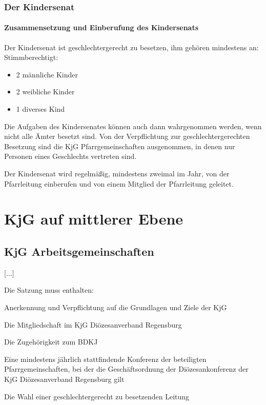 \documentclass[12pt]{report}
\begin{document}
\begin{flushleft}
\subsection{Der Kindersenat}

\subsubsection{Zusammensetzung und Einberufung des Kindersenats}

Der Kindersenat ist {\color{red}geschlechtergerecht} zu besetzen, ihm gehören mindestens an:
Stimmberechtigt:
{\color{red}
\begin{itemize}
  \item 2 männliche Kinder
  \item 2 weibliche Kinder
  \item 1 diverses Kind
\end{itemize}
} %
Die Aufgaben des Kindersenates können auch dann wahrgenommen werden, wenn nicht alle Ämter besetzt sind.
{\color{red}Von der Verpflichtung zur geschlechtergerechten Besetzung sind die KjG Pfarrgemeinschaften ausgenommen,
in denen nur Personen eines Geschlechts vertreten sind.}

Der Kindersenat wird regelmäßig, mindestens zweimal im Jahr, von der Pfarrleitung einberufen
und von einem Mitglied der Pfarrleitung geleitet.

\chapter{KjG auf mittlerer Ebene}

\section{KjG Arbeitsgemeinschaften}
[...]

Die Satzung muss enthalten:
\begin{itemize}
  \item Anerkennung und Verpflichtung auf die Grundlagen und Ziele der KjG
  \item Die Mitgliedschaft im KjG Diözesanverband Regensburg
  \item Die Zugehörigkeit zum BDKJ
  \item Eine mindestens jährlich stattfindende Konferenz der beteiligten Pfarrgemeinschaften, bei der
        die Geschäftsordnung der Diözesankonferenz der KjG Diözesanverband Regensburg gilt
  {\color{red}\item Die Wahl einer geschlechtergerecht zu besetzenden Leitung}
\end{itemize}

\end{flushleft}
\end{document}
